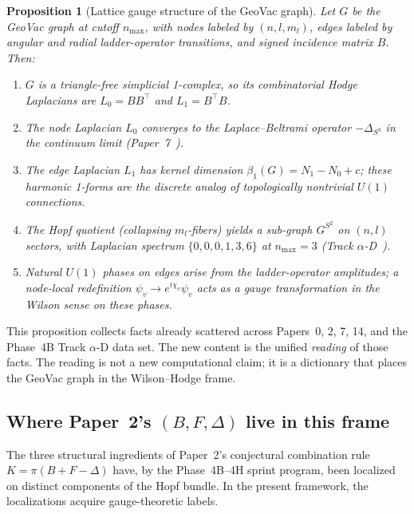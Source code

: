 \documentclass[aps,pra,twocolumn,superscriptaddress,longbibliography]{revtex4-2}
\newtheorem{proposition}{Proposition}
\begin{document}
\begin{proposition}[Lattice gauge structure of the GeoVac graph]
\label{prop:gauge_structure}
Let $G$ be the GeoVac graph at cutoff $n_{\max}$, with nodes labeled
by $(n, l, m_l)$, edges labeled by angular and radial ladder-operator
transitions, and signed incidence matrix $B$.  Then:
\begin{enumerate}
\item $G$ is a triangle-free simplicial 1-complex, so its
  combinatorial Hodge Laplacians are $L_0 = B B^{\top}$ and
  $L_1 = B^{\top} B$.
\item The node Laplacian $L_0$ converges to the Laplace--Beltrami
  operator $-\Delta_{S^3}$ in the continuum limit
  (Paper~7~\cite{Paper7}).
\item The edge Laplacian $L_1$ has kernel dimension
  $\beta_1(G) = N_1 - N_0 + c$; these harmonic 1-forms are the
  discrete analog of topologically nontrivial $U(1)$ connections.
\item The Hopf quotient (collapsing $m_l$-fibers) yields a
  sub-graph $G^{S^2}$ on $(n, l)$ sectors, with Laplacian spectrum
  $\{0, 0, 0, 1, 3, 6\}$ at $n_{\max} = 3$ (Track
  $\alpha$-D~\cite{Paper2}).
\item Natural $U(1)$ phases on edges arise from the
  ladder-operator amplitudes; a node-local redefinition
  $\psi_v \to e^{i\chi_v} \psi_v$ acts as a gauge transformation in
  the Wilson sense on these phases.
\end{enumerate}
\end{proposition}

This proposition collects facts already scattered across
Papers~0, 2, 7, 14, and the Phase~4B Track $\alpha$-D data set.  The
new content is the unified \emph{reading} of those facts.  The reading
is not a new computational claim; it is a dictionary that places the
GeoVac graph in the Wilson--Hodge frame.

\subsection{Where Paper~2's $(B, F, \Delta)$ live in this frame}

The three structural ingredients of Paper~2's conjectural combination
rule $K = \pi(B + F - \Delta)$ have, by the Phase~4B--4H sprint
program, been localized on distinct components of the Hopf bundle.
In the present framework, the localizations acquire gauge-theoretic
labels.
\end{document}
